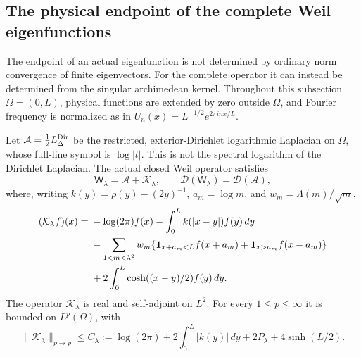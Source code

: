 \subsection*{The physical endpoint of the complete Weil eigenfunctions}

The endpoint of an actual eigenfunction is not determined by ordinary
norm convergence of finite eigenvectors.  For the complete operator it
can instead be determined from the singular archimedean kernel.
Throughout this subsection $\Omega=(0,L)$, physical functions are
extended by zero outside $\Omega$, and Fourier frequency is normalized
as in $U_n(x)=L^{-1/2}e^{2\pi inx/L}$.

\begin{proposition}
\label{prop:v118-log-dirichlet}
Let $\mathcal A=\tfrac12L_\Delta^{\rm Dir}$ be the restricted,
exterior-Dirichlet logarithmic Laplacian on $\Omega$, whose full-line
symbol is $\log|t|$.  This is not the spectral logarithm of the
Dirichlet Laplacian.  The actual closed Weil operator satisfies
\begin{equation}\label{eq:v118-log-decomposition}
 \mathsf W_\lambda=\mathcal A+\mathcal K_\lambda,
 \qquad \mathcal D(\mathsf W_\lambda)=\mathcal D(\mathcal A),
\end{equation}
where, writing $k(y)=\rho(y)-(2y)^{-1}$, $a_m=\log m$, and
$w_m=\Lambda(m)/\sqrt m$,
\begin{align}
 (\mathcal K_\lambda f)(x)={}&-\log(2\pi)f(x)
       -\int_0^L k(|x-y|)f(y)\,dy\notag\\
 &-\sum_{1<m<\lambda^2}w_m
       \{\mathbf1_{x+a_m<L}f(x+a_m)
                   +\mathbf1_{x>a_m}f(x-a_m)\}\notag\\
 &+2\int_0^L\cosh((x-y)/2)f(y)\,dy.
 \label{eq:v118-bounded-physical-part}
\end{align}
The operator $\mathcal K_\lambda$ is real and self-adjoint on $L^2$.
For every $1\le p\le\infty$ it is bounded on $L^p(\Omega)$, with
\begin{equation}\label{eq:v118-K-bound}
 \|\mathcal K_\lambda\|_{p\to p}\le C_\lambda
 :=\log(2\pi)+2\int_0^L|k(y)|\,dy
                  +2P_\lambda+4\sinh(L/2).
\end{equation}
\end{proposition}
